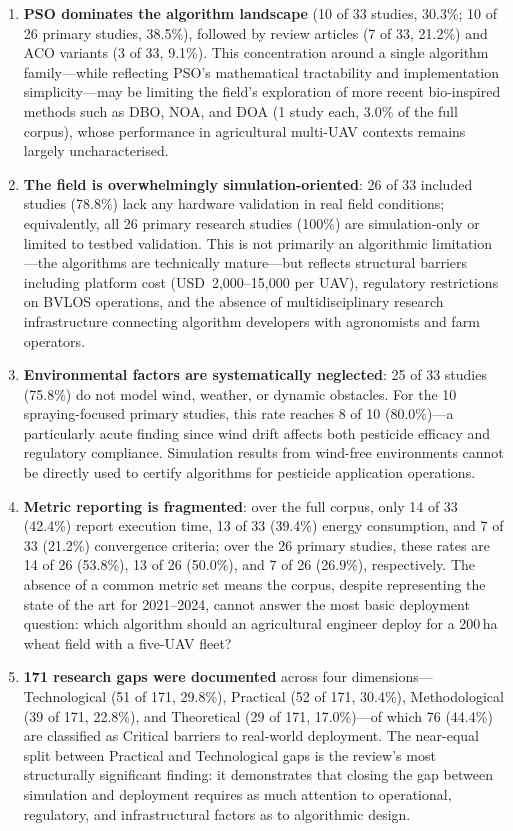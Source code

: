 \documentclass[review,3p,times]{elsarticle}
\begin{document}
\begin{enumerate}
  \item \textbf{PSO dominates the algorithm landscape} (10 of 33 studies, 30.3\%; 10 of 26 primary studies, 38.5\%), followed by review articles (7 of 33, 21.2\%) and ACO variants (3 of 33, 9.1\%). This concentration around a single algorithm family---while reflecting PSO's mathematical tractability and implementation simplicity---may be limiting the field's exploration of more recent bio-inspired methods such as DBO, NOA, and DOA (1 study each, 3.0\% of the full corpus), whose performance in agricultural multi-UAV contexts remains largely uncharacterised.

  \item \textbf{The field is overwhelmingly simulation-oriented}: 26 of 33 included studies (78.8\%) lack any hardware validation in real field conditions; equivalently, all 26 primary research studies (100\%) are simulation-only or limited to testbed validation. This is not primarily an algorithmic limitation---the algorithms are technically mature---but reflects structural barriers including platform cost (USD~2,000--15,000 per UAV), regulatory restrictions on BVLOS operations, and the absence of multidisciplinary research infrastructure connecting algorithm developers with agronomists and farm operators.

  \item \textbf{Environmental factors are systematically neglected}: 25 of 33 studies (75.8\%) do not model wind, weather, or dynamic obstacles. For the 10 spraying-focused primary studies, this rate reaches 8 of 10 (80.0\%)---a particularly acute finding since wind drift affects both pesticide efficacy and regulatory compliance. Simulation results from wind-free environments cannot be directly used to certify algorithms for pesticide application operations.

  \item \textbf{Metric reporting is fragmented}: over the full corpus, only 14 of 33 (42.4\%) report execution time, 13 of 33 (39.4\%) energy consumption, and 7 of 33 (21.2\%) convergence criteria; over the 26 primary studies, these rates are 14 of 26 (53.8\%), 13 of 26 (50.0\%), and 7 of 26 (26.9\%), respectively. The absence of a common metric set means the corpus, despite representing the state of the art for 2021--2024, cannot answer the most basic deployment question: which algorithm should an agricultural engineer deploy for a 200\,ha wheat field with a five-UAV fleet?

  \item \textbf{171 research gaps were documented} across four dimensions---Technological (51 of 171, 29.8\%), Practical (52 of 171, 30.4\%), Methodological (39 of 171, 22.8\%), and Theoretical (29 of 171, 17.0\%)---of which 76 (44.4\%) are classified as Critical barriers to real-world deployment. The near-equal split between Practical and Technological gaps is the review's most structurally significant finding: it demonstrates that closing the gap between simulation and deployment requires as much attention to operational, regulatory, and infrastructural factors as to algorithmic design.
\end{enumerate}
\end{document}
